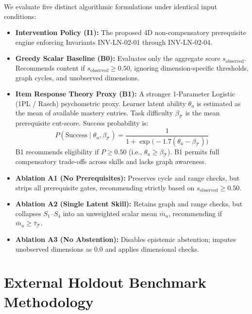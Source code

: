 \documentclass[11pt,a4paper]{article}
\begin{document}
We evaluate five distinct algorithmic formulations under identical input conditions:
\begin{itemize}[leftmargin=1.5em]
    \item \textbf{Intervention Policy (I1):} The proposed 4D non-compensatory prerequisite engine enforcing Invariants INV-LN-02-01 through INV-LN-02-04.
    \item \textbf{Greedy Scalar Baseline (B0):} Evaluates only the aggregate score $s_{\text{observed}}$. Recommends content if $s_{\text{observed}} \ge 0.50$, ignoring dimension-specific thresholds, graph cycles, and unobserved dimensions.
    \item \textbf{Item Response Theory Proxy (B1):} A stronger 1-Parameter Logistic (1PL / Rasch) psychometric proxy. Learner latent ability $\theta_u$ is estimated as the mean of available mastery entries. Task difficulty $\beta_{\mathcal{T}}$ is the mean prerequisite cut-score. Success probability is:
    \begin{equation}
        P(\text{Success} \mid \theta_u, \beta_{\mathcal{T}}) = \frac{1}{1 + \exp\big(-1.7(\theta_u - \beta_{\mathcal{T}})\big)}
    \end{equation}
    B1 recommends eligibility if $P \ge 0.50$ (i.e., $\theta_u \ge \beta_{\mathcal{T}}$). B1 permits full compensatory trade-offs across skills and lacks graph awareness.
    \item \textbf{Ablation A1 (No Prerequisites):} Preserves cycle and range checks, but strips all prerequisite gates, recommending strictly based on $s_{\text{observed}} \ge 0.50$.
    \item \textbf{Ablation A2 (Single Latent Skill):} Retains graph and range checks, but collapses $S_1$--$S_4$ into an unweighted scalar mean $\bar{m}_u$, recommending if $\bar{m}_u \ge \bar{\tau}_{\mathcal{T}}$.
    \item \textbf{Ablation A3 (No Abstention):} Disables epistemic abstention; imputes unobserved dimensions as $0.0$ and applies dimensional checks.
\end{itemize}

\section{External Holdout Benchmark Methodology}
\end{document}
